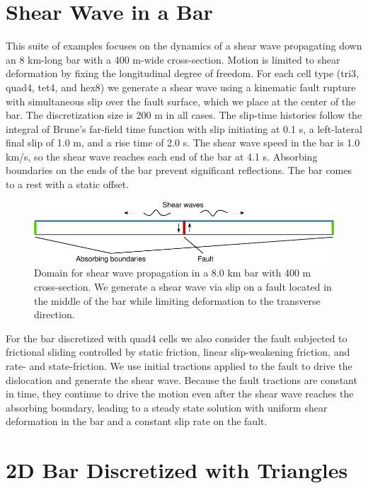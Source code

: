 \section{Shear Wave in a Bar}

This suite of examples focuses on the dynamics of a shear wave propagating
down an 8 km-long bar with a 400 m-wide cross-section. Motion is limited
to shear deformation by fixing the longitudinal degree of freedom.
For each cell type (tri3, quad4, tet4, and hex8) we generate a shear
wave using a kinematic fault rupture with simultaneous slip over the
fault surface, which we place at the center of the bar. The discretization
size is 200 m in all cases. The slip-time histories follow the integral
of Brune's far-field time function with slip initiating at 0.1 s,
a left-lateral final slip of 1.0 m, and a rise time of 2.0 s. The
shear wave speed in the bar is 1.0 km/s, so the shear wave reaches
each end of the bar at 4.1 s. Absorbing boundaries on the ends of
the bar prevent significant reflections. The bar comes to a rest with
a static offset.

\begin{figure}
  \includegraphics{examples/figs/shearwave_bar}
  \caption{Domain for shear wave propagation in a 8.0 km bar with 400
    m cross-section.  We generate a shear wave via slip on a fault
    located in the middle of the bar while limiting deformation to the
    transverse direction.}
  \label{fig:shearwave:domain}
\end{figure}

For the bar discretized with quad4 cells we also consider the fault
subjected to frictional sliding controlled by static friction, linear
slip-weakening friction, and rate- and state-friction. We use initial
tractions applied to the fault to drive the dislocation and generate
the shear wave. Because the fault tractions are constant in time, they
continue to drive the motion even after the shear wave reaches the
absorbing boundary, leading to a steady state solution with uniform
shear deformation in the bar and a constant slip rate on the fault.


\section{2D Bar Discretized with Triangles}
\label{sec:example:shearwave:tri3}

